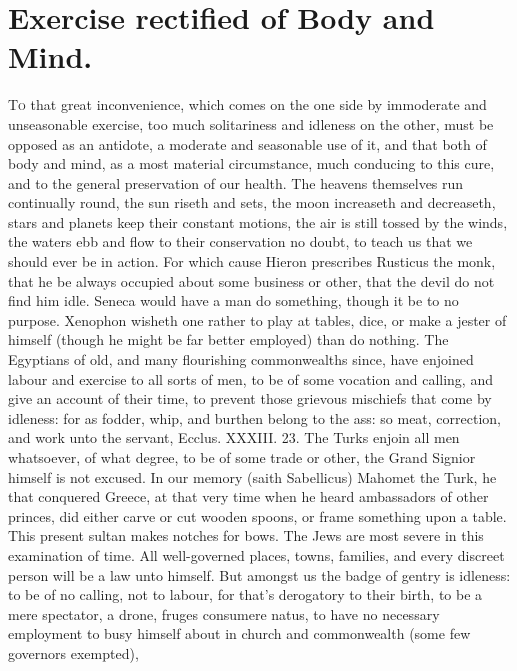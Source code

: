 {%

\section{Exercise rectified of Body and Mind.}

\lettrine{T}{o} that great inconvenience, which comes on the one side by immoderate
and unseasonable exercise, too much solitariness and idleness on the
other, must be opposed as an antidote, a moderate and seasonable use of
it, and that both of body and mind, as a most material circumstance,
much conducing to this cure, and to the general preservation of our
health. The heavens themselves run continually round, the sun riseth
and sets, the moon increaseth and decreaseth, stars and planets keep
their constant motions, the air is still tossed by the winds, the
waters ebb and flow to their conservation no doubt, to teach us that we
should ever be in action. For which cause Hieron prescribes Rusticus
the monk, that he be always occupied about some business or other,
that the devil do not find him idle. Seneca would have a
man do something, though it be to no purpose. Xenophon wisheth
one rather to play at tables, dice, or make a jester of himself (though
he might be far better employed) than do nothing. The Egyptians
of old, and many flourishing commonwealths since, have enjoined labour
and exercise to all sorts of men, to be of some vocation and calling,
and give an account of their time, to prevent those grievous mischiefs
that come by idleness: for as fodder, whip, and burthen belong to the
ass: so meat, correction, and work unto the servant, Ecclus. XXXIII.
23. The Turks enjoin all men whatsoever, of what degree, to be of some
trade or other, the Grand Signior himself is not excused. In our
memory (saith Sabellicus) Mahomet the Turk, he that conquered Greece,
at that very time when he heard ambassadors of other princes, did
either carve or cut wooden spoons, or frame something upon a table.
This present sultan makes notches for bows. The Jews are most
severe in this examination of time. All well-governed places, towns,
families, and every discreet person will be a law unto himself. But
amongst us the badge of gentry is idleness: to be of no calling, not to
labour, for that's derogatory to their birth, to be a mere spectator, a
drone, fruges consumere natus, to have no necessary employment to busy
himself about in church and commonwealth (some few governors exempted),
}
